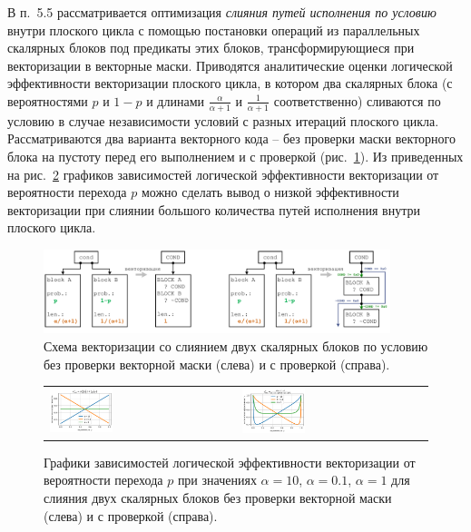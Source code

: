 \documentclass[a4paper,14pt]{extarticle}                     %
\theoremstyle{plain}                                         %
\begin{document}
В п.~5.5 рассматривается оптимизация \textit{слияния путей исполнения по условию} внутри плоского цикла с помощью постановки операций из параллельных скалярных блоков под предикаты этих блоков, трансформирующиеся при векторизации в векторные маски.
Приводятся аналитические оценки логической эффективности векторизации плоского цикла, в котором два скалярных блока (с вероятностями $p$ и $1 - p$ и длинами $\frac{\alpha}{\alpha + 1}$ и $\frac{1}{\alpha + 1}$ соответственно) сливаются по условию в случае независимости условий с разных итераций плоского цикла.
Рассматриваются два варианта векторного кода -- без проверки маски векторного блока на пустоту перед его выполнением и с проверкой (рис.~\ref{fig:vec_ifconv_nocheck_check}).
Из приведенных на рис.~\ref{fig:text_4_vec_under_cond_chart_e_merged} графиков зависимостей логической эффективности векторизации от вероятности перехода $p$ можно сделать вывод о низкой эффективности векторизации при слиянии большого количества путей исполнения внутри плоского цикла.

\begin{figure}[!ht]
\centering
\includegraphics[width=0.9\textwidth]{./fig/vec_ifconv_nocheck_check.pdf}
\singlespacing
\caption{Схема векторизации со слиянием двух скалярных блоков по условию без проверки векторной маски (слева) и с проверкой (справа).}
\label{fig:vec_ifconv_nocheck_check}
\end{figure}

\begin{figure}[!ht]
\centering
\begin{tabular}{ll}
	\includegraphics[width=0.35\textwidth]{./pics/text_4_vec_mrg_under_cond/chart_e_merged.png}
	&
	\includegraphics[width=0.35\textwidth]{./pics/text_4_vec_check_mask/chart_e_merged.png}
\end{tabular}
\singlespacing
\caption{Графики зависимостей логической эффективности векторизации от вероятности перехода $p$ при значениях $\alpha = 10$, $\alpha = 0.1$, $\alpha = 1$ для слияния двух скалярных блоков без проверки векторной маски (слева) и с проверкой (справа).}
\label{fig:text_4_vec_under_cond_chart_e_merged}
\end{figure}
\end{document}
